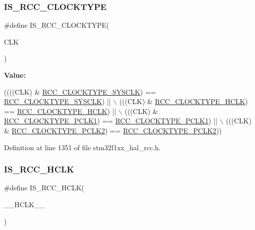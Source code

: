 \subsubsection{\texorpdfstring{I\+S\+\_\+\+R\+C\+C\+\_\+\+C\+L\+O\+C\+K\+T\+Y\+PE}{IS\_RCC\_CLOCKTYPE}}
{\footnotesize\ttfamily \#define I\+S\+\_\+\+R\+C\+C\+\_\+\+C\+L\+O\+C\+K\+T\+Y\+PE(\begin{DoxyParamCaption}\item[{}]{C\+LK }\end{DoxyParamCaption})}

{\bfseries Value\+:}
\begin{DoxyCode}
((((CLK) & \hyperlink{group___r_c_c___system___clock___type_ga7e721f5bf3fe925f78dae0356165332e}{RCC\_CLOCKTYPE\_SYSCLK}) == \hyperlink{group___r_c_c___system___clock___type_ga7e721f5bf3fe925f78dae0356165332e}{RCC\_CLOCKTYPE\_SYSCLK}) || \(\backslash\)
                               (((CLK) & \hyperlink{group___r_c_c___system___clock___type_gaa5330efbd790632856a2b15851517ef9}{RCC\_CLOCKTYPE\_HCLK})   == 
      \hyperlink{group___r_c_c___system___clock___type_gaa5330efbd790632856a2b15851517ef9}{RCC\_CLOCKTYPE\_HCLK})   || \(\backslash\)
                               (((CLK) & \hyperlink{group___r_c_c___system___clock___type_gab00c7b70f0770a616be4b5df45a454c4}{RCC\_CLOCKTYPE\_PCLK1})  == 
      \hyperlink{group___r_c_c___system___clock___type_gab00c7b70f0770a616be4b5df45a454c4}{RCC\_CLOCKTYPE\_PCLK1})  || \(\backslash\)
                               (((CLK) & \hyperlink{group___r_c_c___system___clock___type_gaef7e78706e597a6551d71f5f9ad60cc0}{RCC\_CLOCKTYPE\_PCLK2})  == 
      \hyperlink{group___r_c_c___system___clock___type_gaef7e78706e597a6551d71f5f9ad60cc0}{RCC\_CLOCKTYPE\_PCLK2}))
\end{DoxyCode}


Definition at line 1351 of file stm32f1xx\+\_\+hal\+\_\+rcc.\+h.

\mbox{\label{group___r_c_c___private___macros_ga0f01b4d9e55bcb7fcbd2c08f6d7bb5b3}} 
\subsubsection{\texorpdfstring{I\+S\+\_\+\+R\+C\+C\+\_\+\+H\+C\+LK}{IS\_RCC\_HCLK}}
{\footnotesize\ttfamily \#define I\+S\+\_\+\+R\+C\+C\+\_\+\+H\+C\+LK(\begin{DoxyParamCaption}\item[{}]{\+\_\+\+\_\+\+H\+C\+L\+K\+\_\+\+\_\+ }\end{DoxyParamCaption})}

